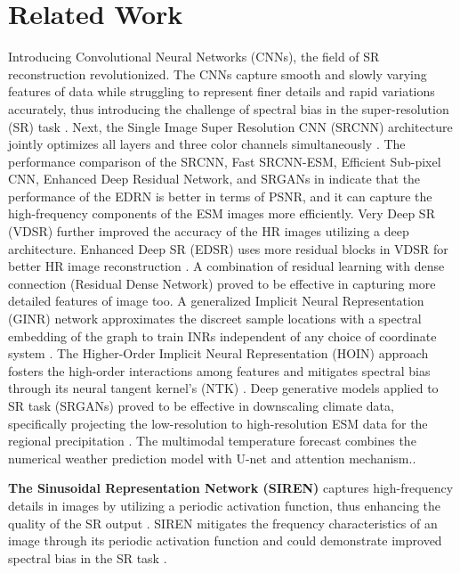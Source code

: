 \section{Related Work}
\label{sec-related}
Introducing Convolutional Neural Networks (CNNs), the field of SR reconstruction revolutionized\cite{Dong2016}. The CNNs capture smooth and slowly varying features of data while struggling to represent finer details and rapid variations accurately, thus introducing the challenge of spectral bias in the super-resolution (SR) task \cite{Zhang2019}. Next, the Single Image Super Resolution CNN (SRCNN) architecture jointly optimizes all layers and three color channels simultaneously \cite{Dong2016}. The performance comparison of the SRCNN, Fast SRCNN-ESM, Efficient Sub-pixel CNN, Enhanced Deep Residual Network, and SRGANs in \cite{Nikhil2024} indicate that the performance of the EDRN is better in terms of PSNR, and it can capture the high-frequency components of the ESM images more efficiently. Very Deep SR (VDSR) further improved the accuracy of the HR images utilizing a deep architecture\cite{Kim2016VDSR}. Enhanced Deep SR (EDSR) uses more residual blocks in VDSR for better HR image reconstruction \cite{Kim2016EDSR}. A combination of residual learning with dense connection (Residual Dense Network) proved to be effective in capturing more detailed features of image too\cite{Zhang2018}. A generalized Implicit Neural Representation (GINR) network approximates the discreet sample locations with a spectral embedding of the graph to train INRs independent of any choice of coordinate system \cite{grattarola2022ginr}. The Higher-Order Implicit Neural Representation (HOIN) approach fosters the high-order interactions among features and mitigates spectral bias through its neural tangent kernel's (NTK) \cite{chen2024hoin}. Deep generative models applied to SR task (SRGANs) proved to be effective in downscaling climate data, specifically projecting the low-resolution to high-resolution ESM data for the regional precipitation \cite{shidqi2023}. The multimodal temperature forecast combines the numerical weather prediction model with U-net and attention mechanism.\cite{Ding2024}.

\noindent \textbf{The Sinusoidal Representation Network (SIREN)} captures high-frequency details in images by utilizing a periodic activation function, thus enhancing the quality of the SR output \cite{SIREN}. SIREN mitigates the frequency characteristics of an image through its periodic activation function and could demonstrate improved spectral bias in the SR task \cite{SIREN}. 

